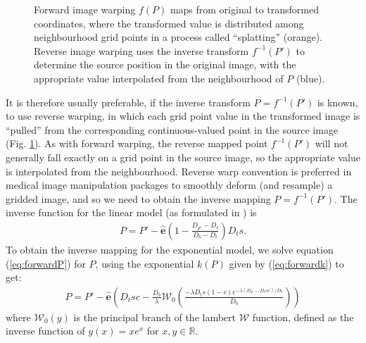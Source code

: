 \documentclass[12pt,phd,a4paper,twoside]{ucl_thesis}
\renewcommand{\textcite}[2][]{
\ifthenelse { \equal {#1} {} }  {\citeauthor{#2}\autocite{#2}}   {\citeauthor{#1}\autocite{#2}}}
\begin{document}
\begin{figure}[h!]
  \centering
  
  \caption[Forward and reverse image warping]{Forward image warping $f(P)$ maps from original to transformed coordinates, where the transformed value is distributed among neighbourhood grid points in a process called ``splatting'' (orange). Reverse image warping uses the inverse transform $f^{-1}(P')$ to determine the source position in the original image, with the appropriate value interpolated from the neighbourhood of $P$ (blue).}
  \label{fig:warp}
\end{figure}

It is therefore usually preferable, if the inverse transform $P = f^{-1}(P')$ is known, to use reverse warping, in which each grid point value in the transformed image is ``pulled'' from the corresponding continuous-valued point in the source image (Fig. \ref{fig:warp}).
As with forward warping, the reverse mapped point $f^{-1}(P')$ will not generally fall exactly on a grid point in the source image, so the appropriate value is interpolated from the neighbourhood.
Reverse warp convention is preferred in medical image manipulation packages to smoothly deform (and resample) a gridded image, and so we need to obtain the inverse mapping $P = f^{-1}(P')$.
The inverse function for the linear model (as formulated in \textcite{Nowinski2005}) is
\begin{align}
  P = P' - \mathbf{\hat{e}}(1-\frac{D_{p'}-D_t}{D_b-D_t})D_ts.
\end{align}
To obtain the inverse mapping for the exponential model, we solve equation (\ref{eq:forwardP}) for $P$, using the exponential $k(P)$ given by (\ref{eq:forwardk}) to get:
\begin{align}
  P = P' - \mathbf{\hat{e}}(D_t s c - \frac{D_b}{\lambda}\mathcal{W}_0(\frac{-\lambda D_t s (1-c) e^{-\lambda(D_{p'}-D_tsc)/D_b}}{D_b}))
\end{align}
where $\mathcal{W}_0(y)$ is the principal branch of the lambert $\mathcal{W}$ function, defined as the inverse function of $ y(x) = xe^x $ for $x,y \in \mathbb{R}$.
\end{document}
